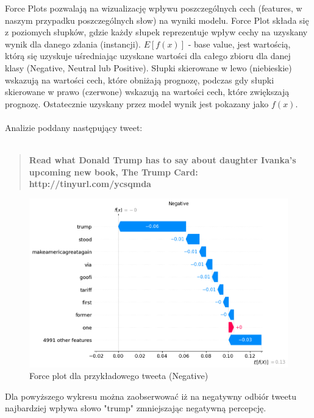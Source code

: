 \documentclass{article}
\begin{document}
 Force Plots pozwalają na wizualizację wpływu poszczególnych cech (features, w naszym przypadku poszczególnych słow) na wyniki modelu. Force Plot składa się z poziomych słupków, gdzie każdy słupek reprezentuje wpływ cechy na uzyskany wynik dla danego zdania (instancji). $E[f(x)]$ - base value, jest wartością, którą się uzyskuje uśredniając uzyskane wartości dla całego zbioru dla danej klasy (Negative, Neutral lub Positive). Słupki skierowane w lewo (niebieskie) wskazują na wartości cech, które obniżają prognozę, podczas gdy słupki skierowane w prawo (czerwone) wskazują na wartości cech, które zwiększają prognozę. Ostatecznie uzyskany przez model wynik jest pokazany jako $f(x)$.
\\
\\
 Analizie poddany następujący tweet:
 \\
 \\
 \begin{quote}
 \textbf{Read what Donald Trump has to say about daughter Ivanka's upcoming new book, The Trump Card: http://tinyurl.com/ycsqmda}
\end{quote}

\begin{figure}[H]
    \centering
    \includegraphics[width=\textwidth]{assets/force_2_negative.png}
    \caption{Force plot dla przykładowego tweeta (Negative)}
\end{figure}

\noindent Dla powyższego wykresu można zaobserwować iż na negatywny odbiór tweetu
najbardziej wpływa słowo "trump" zmniejszając negatywną percepcję. 
\end{document}
